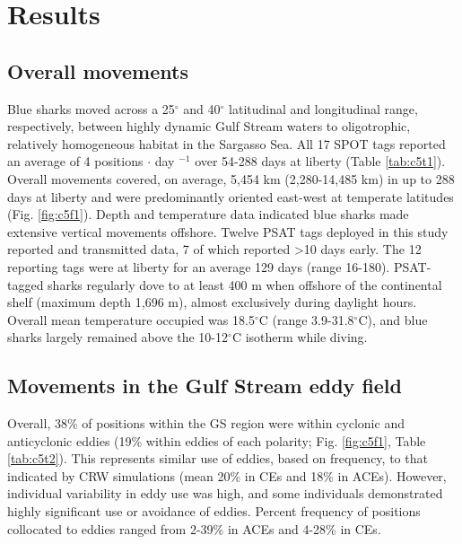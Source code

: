 \section{Results}

\subsection{Overall movements}

Blue sharks moved across a 25$^{\circ}$ and 40$^{\circ}$ latitudinal and longitudinal range, respectively, between highly dynamic Gulf Stream waters to oligotrophic, relatively homogeneous habitat in the Sargasso Sea. All 17 SPOT tags reported an average of 4 positions $\cdot$ day $^{-1}$ over 54-288 days at liberty (Table \cref{tab:c5t1}). Overall movements covered, on average, 5,454 km (2,280-14,485 km) in up to 288 days at liberty and were predominantly oriented east-west at temperate latitudes (Fig. \cref{fig:c5f1}). Depth and temperature data indicated blue sharks made extensive vertical movements offshore. Twelve PSAT tags deployed in this study reported and transmitted data, 7 of which reported >10 days early. The 12 reporting tags were at liberty for an average 129 days (range 16-180). PSAT-tagged sharks regularly dove to at least 400 m when offshore of the continental shelf (maximum depth 1,696 m), almost exclusively during daylight hours. Overall mean temperature occupied was 18.5$^\circ$C (range 3.9-31.8$^\circ$C), and blue sharks largely remained above the 10-12$^\circ$C isotherm while diving.

\subsection{Movements in the Gulf Stream eddy field}

Overall, 38\% of positions within the GS region were within cyclonic and anticyclonic eddies (19\% within eddies of each polarity; Fig. \cref{fig:c5f1}, Table \cref{tab:c5t2}). This represents similar use of eddies, based on frequency, to that indicated by CRW simulations (mean 20\% in CEs and 18\% in ACEs). However, individual variability in eddy use was high, and some individuals demonstrated highly significant use or avoidance of eddies. Percent frequency of positions collocated to eddies ranged from 2-39\% in ACEs and 4-28\% in CEs.

